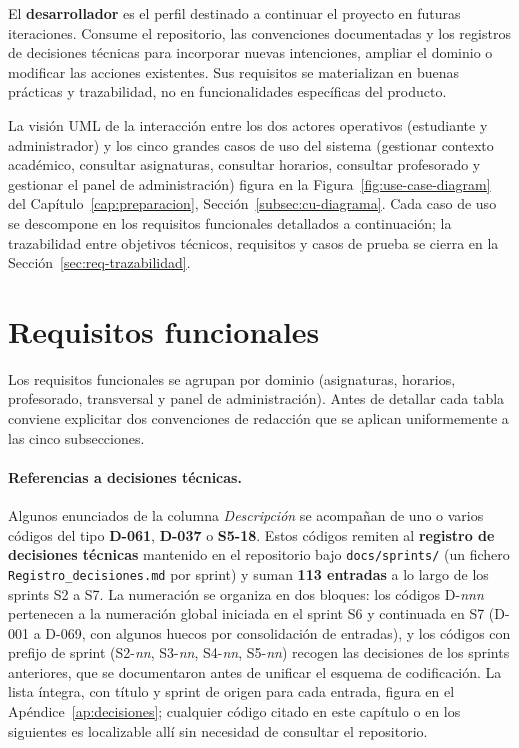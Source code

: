 El \textbf{desarrollador} es el perfil destinado a continuar el proyecto en futuras iteraciones. Consume el repositorio, las convenciones documentadas y los registros de decisiones técnicas para incorporar nuevas intenciones, ampliar el dominio o modificar las acciones existentes. Sus requisitos se materializan en buenas prácticas y trazabilidad, no en funcionalidades específicas del producto.

La visión UML de la interacción entre los dos actores operativos (estudiante y administrador) y los cinco grandes casos de uso del sistema (gestionar contexto académico, consultar asignaturas, consultar horarios, consultar profesorado y gestionar el panel de administración) figura en la Figura~\ref{fig:use-case-diagram} del Capítulo~\ref{cap:preparacion}, Sección~\ref{subsec:cu-diagrama}. Cada caso de uso se descompone en los requisitos funcionales detallados a continuación; la trazabilidad entre objetivos técnicos, requisitos y casos de prueba se cierra en la Sección~\ref{sec:req-trazabilidad}.

\section{Requisitos funcionales}\label{sec:req-funcionales}

Los requisitos funcionales se agrupan por dominio (asignaturas, horarios, profesorado, transversal y panel de administración). Antes de detallar cada tabla conviene explicitar dos convenciones de redacción que se aplican uniformemente a las cinco subsecciones.

\paragraph{Referencias a decisiones técnicas.} Algunos enunciados de la columna \textit{Descripción} se acompañan de uno o varios códigos del tipo \textbf{D-061}, \textbf{D-037} o \textbf{S5-18}. Estos códigos remiten al \textbf{registro de decisiones técnicas} mantenido en el repositorio bajo \texttt{docs/sprints/} (un fichero \texttt{Registro\_decisiones.md} por sprint) y suman \textbf{113 entradas} a lo largo de los sprints S2 a S7. La numeración se organiza en dos bloques: los códigos D-\textit{nnn} pertenecen a la numeración global iniciada en el sprint S6 y continuada en S7 (D-001 a D-069, con algunos huecos por consolidación de entradas), y los códigos con prefijo de sprint (S2-\textit{nn}, S3-\textit{nn}, S4-\textit{nn}, S5-\textit{nn}) recogen las decisiones de los sprints anteriores, que se documentaron antes de unificar el esquema de codificación. La lista íntegra, con título y sprint de origen para cada entrada, figura en el Apéndice~\ref{ap:decisiones}; cualquier código citado en este capítulo o en los siguientes es localizable allí sin necesidad de consultar el repositorio.

